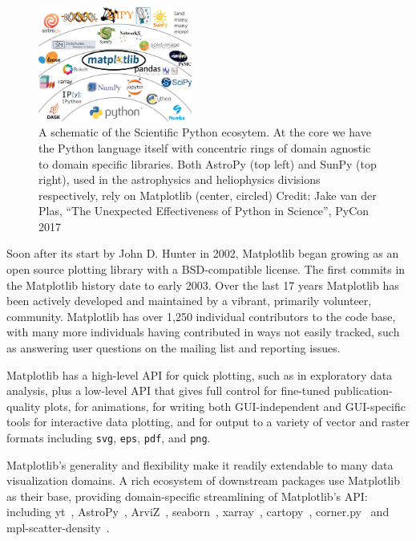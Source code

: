 \documentclass[12pt]{article}
\numberwithin{page}{section}
\begin{document}
\begin{figure}
  \includegraphics[width=0.45\textwidth]{scipy-ecosystem}
  \caption{\small A schematic of the Scientific Python ecosytem.  At the
    core we have the Python language itself with concentric rings of
    domain agnostic to domain specific libraries.  Both AstroPy (top
    left) and SunPy (top right), used in the astrophysics and
    heliophysics divisions respectively, rely on Matplotlib (center, circled)
    Credit: Jake van der Plas, ``The Unexpected Effectiveness of Python
    in Science'', PyCon 2017}
  \label{fig:ecosystem}
\end{figure}


Soon after its start by John D. Hunter in 2002, Matplotlib began growing as an
open source plotting
library with a BSD-compatible license. The
first commits in the Matplotlib history date to early 2003.  Over the
last 17 years Matplotlib has been actively developed and maintained by
a vibrant, primarily volunteer, community.  Matplotlib has over 1,250
individual contributors to the code base, with many more individuals
having contributed in ways not easily tracked, such as answering user
questions on the mailing list and reporting issues.

Matplotlib has a high-level API for quick plotting, such as in
exploratory data analysis, plus a low-level API that gives full control for
fine-tuned publication-quality plots, for animations, for writing both
GUI-independent and GUI-specific tools for interactive data plotting, and
for output to a variety of vector and raster
formats including \texttt{svg}, \texttt{eps},
\texttt{pdf}, and \texttt{png}.

Matplotlib's generality and flexibility make it readily extendable to
many data visualization domains.  A rich ecosystem of downstream packages use
Matplotlib as their base, providing domain-specific streamlining of
Matplotlib's API: including
yt~\cite{2011ApJS..192....9T}, AstroPy~\cite{astropy:2013,
  astropy:2018}, ArviZ~\cite{arviz_2019},
seaborn~\cite{waskom2020seaborn}, xarray~\cite{hoyer2017xarray},
cartopy~\cite{Cartopy}, corner.py~\cite{corner} and
mpl-scatter-density~\cite{mpl-scatter-density}.
\end{document}
